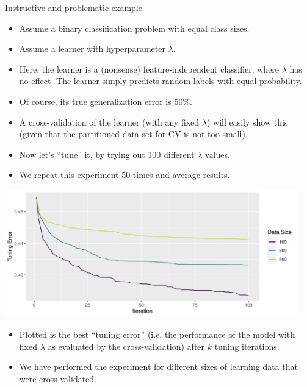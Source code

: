 \documentclass[11pt,compress,t,notes=noshow, xcolor=table]{beamer}
\newenvironment{knitrout}{}{} %
\begin{document}
\begin{vbframe}{Instructive and problematic example}
\begin{itemize}
    \item Assume a binary classification problem with equal class sizes.
    \item Assume a learner with hyperparameter $\lambda$.
    \item Here, the learner is a (nonsense) feature-independent classifier,
          where $\lambda$ has no effect. The learner simply
          predicts random labels with equal probability.
    \item Of course, its true generalization error is 50\%.
    \item A cross-validation of the learner (with any fixed $\lambda$) will easily show this
      (given that the partitioned data set for CV is not too small).
    \item Now let's \enquote{tune} it, by trying out 100 different $\lambda$ values.
    \item We repeat this experiment 50 times and average results.
\end{itemize}

\framebreak

\begin{knitrout}\scriptsize
{}\color{fgcolor}

{\centering \includegraphics[width=0.95\textwidth]{figure/cart_tuning_nestintro_1}
}


\end{knitrout}

\begin{itemize}
\item Plotted is the best \enquote{tuning error} (i.e. the performance of the model with fixed $\lambda$ as evaluated by the cross-validation) after $k$ tuning iterations.
\item We have performed the experiment for different sizes of learning data
      that were cross-validated.
\end{itemize}


\end{vbframe}
\end{document}
